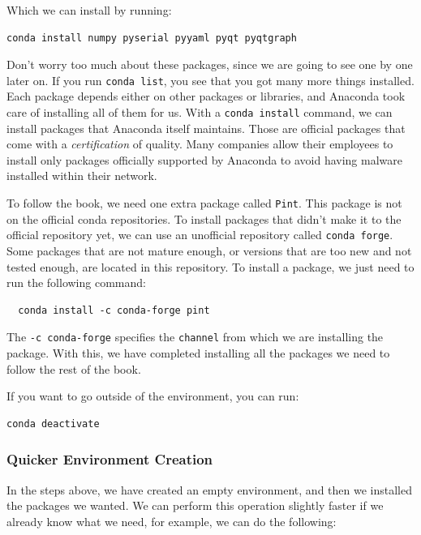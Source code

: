 Which we can install by running:

\begin{verbatim}
conda install numpy pyserial pyyaml pyqt pyqtgraph
\end{verbatim}

Don't worry too much about these packages, since we are going to see one by one later on. If you run \texttt{conda list}, you see that you got many more things installed. Each package depends either on other packages or libraries, and Anaconda took care of installing all of them for us. With a \texttt{conda install} command, we can install packages that Anaconda itself maintains. Those are official packages that come with a \emph{certification} of quality. Many companies allow their employees to install only packages officially supported by Anaconda to avoid having malware installed within their network.

To follow the book, we need one extra package called \texttt{Pint}. This package is not on the official conda repositories. To install packages that didn't make it to the official repository yet, we can use an unofficial repository called \texttt{conda forge}. Some packages that are not mature enough, or versions that are too new and not tested enough, are located in this repository. To install a package, we just need to run the following command:

\begin{verbatim}
  conda install -c conda-forge pint
\end{verbatim}

The \texttt{-c conda-forge} specifies the \texttt{channel} from which we are installing the package. With this, we have completed installing all the packages we need to follow the rest of the book.

If you want to go outside of the environment, you can run:

\begin{verbatim}
conda deactivate
\end{verbatim}

\subsubsection{Quicker Environment Creation}
In the steps above, we have created an empty environment, and then we installed the packages we wanted. We can perform this operation slightly faster if we already know what we need, for example, we can do the following:

